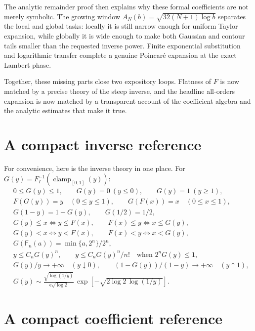 \documentclass[11pt,oneside]{article}
\theoremstyle{definition}
\theoremstyle{remark}
\newcommand{\e}{\mathrm e}
\newcommand{\InvF}{G}
\newcommand{\clamp}{\operatorname{clamp}_{[0,1]}}
\begin{document}
The analytic remainder proof then explains why these formal coefficients
are not merely symbolic.  The growing window
$A_N(b)=\sqrt{32(N+1)\log b}$ separates the local and global tasks:
locally it is still narrow enough for uniform Taylor expansion, while
globally it is wide enough to make both Gaussian and contour tails smaller
than the requested inverse power.  Finite exponential substitution and
logarithmic transfer complete a genuine Poincar\'e expansion at the exact
Lambert phase.

Together, these missing parts close two expository loops.  Flatness of
$F$ is now matched by a precise theory of the steep inverse, and the
headline all-orders expansion is now matched by a transparent account of
the coefficient algebra and the analytic estimates that make it true.

\appendix

\section{A compact inverse reference}
\label{app:inverse-reference}

For convenience, here is the inverse theory in one place.  For
$\InvF(y)=F_I^{-1}(\clamp(y))$:
\begin{align*}
&0\leq\InvF(y)\leq1,\qquad
 \InvF(y)=0\ (y\leq0),\qquad
 \InvF(y)=1\ (y\geq1),\\
&F(\InvF(y))=y\quad(0\leq y\leq1),\qquad
 \InvF(F(x))=x\quad(0\leq x\leq1),\\
&\InvF(1-y)=1-\InvF(y),\qquad
 \InvF(1/2)=1/2,\\
&\InvF(y)\leq x\iff y\leq F(x),\qquad
 F(x)\leq y\iff x\leq\InvF(y),\\
&\InvF(y)<x\iff y<F(x),\qquad
 F(x)<y\iff x<\InvF(y),\\
&\InvF(\mathsf F_n(a))
 =\min\{a,2^n\}/2^n,\\
&y\leq C_n\InvF(y)^n,\qquad
 y\leq C_n\InvF(y)^n/n!
 \quad\text{when }2^n\InvF(y)\leq1,\\
&\InvF(y)/y\to+\infty\quad(y\downarrow0),\qquad
 (1-\InvF(y))/(1-y)\to+\infty\quad(y\uparrow1),\\
&\InvF(y)\sim
 \frac{\sqrt{\log(1/y)}}{\e\sqrt{\log2}}\,
 \exp\!\left[-\sqrt{2\log2\,\log(1/y)}\right].
\end{align*}

\section{A compact coefficient reference}
\label{app:coefficient-reference}
\end{document}
